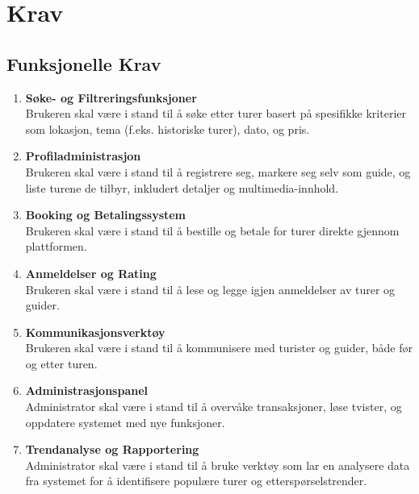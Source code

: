 \documentclass[../doc.tex]{subfiles}
\begin{document}
\section{Krav}
\subsection{Funksjonelle Krav}
\begin{enumerate}
    \item \textbf{Søke- og Filtreringsfunksjoner} \\
    Brukeren skal være i stand til å søke etter turer basert på spesifikke kriterier som lokasjon, tema (f.eks. historiske turer), dato, og pris.

    \item \textbf{Profiladministrasjon} \\
    Brukeren skal være i stand til å registrere seg, markere seg selv som guide, og liste turene de tilbyr, inkludert detaljer og multimedia-innhold.

    \item \textbf{Booking og Betalingssystem} \\
    Brukeren skal være i stand til å bestille og betale for turer direkte gjennom plattformen.

    \item \textbf{Anmeldelser og Rating} \\ 
    Brukeren skal være i stand til å lese og legge igjen anmeldelser av turer og guider.

    \item \textbf{Kommunikasjonsverktøy} \\
    Brukeren skal være i stand til å kommunisere med turister og guider, både før og etter turen.

    \item \textbf{Administrasjonspanel} \\
    Administrator skal være i stand til å overvåke transaksjoner, løse tvister, og oppdatere systemet med nye funksjoner.

    \item \textbf{Trendanalyse og Rapportering} \\
    Administrator skal være i stand til å bruke verktøy som lar en analysere data fra systemet for å identifisere populære turer og etterspørselstrender. 

\end{enumerate}
\end{document}
